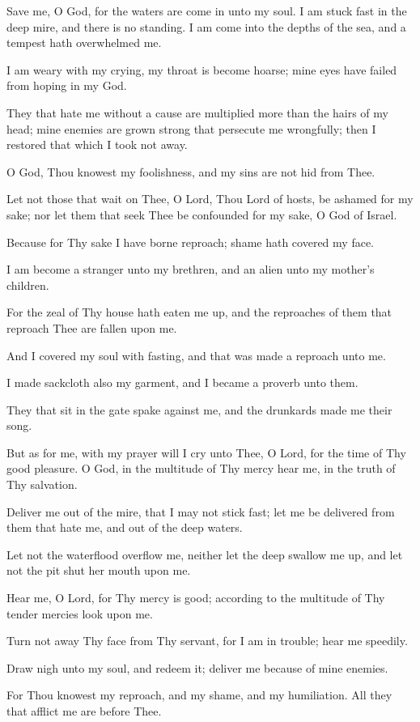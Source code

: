 Save me, O God, for the waters are come in unto my soul. I am stuck fast in the deep mire, and there is no standing. I am come into the depths of the sea, and a tempest hath overwhelmed me.

I am weary with my crying, my throat is become hoarse; mine eyes have failed from hoping in my God.

They that hate me without a cause are multiplied more than the hairs of my head; mine enemies are grown strong that persecute me wrongfully; then I restored that which I took not away.

O God, Thou knowest my foolishness, and my sins are not hid from Thee.

Let not those that wait on Thee, O Lord, Thou Lord of hosts, be ashamed for my sake; nor let them that seek Thee be confounded for my sake, O God of Israel.

Because for Thy sake I have borne reproach; shame hath covered my face.

I am become a stranger unto my brethren, and an alien unto my mother's children.

For the zeal of Thy house hath eaten me up, and the reproaches of them that reproach Thee are fallen upon me.

And I covered my soul with fasting, and that was made a reproach unto me.

I made sackcloth also my garment, and I became a proverb unto them.

They that sit in the gate spake against me, and the drunkards made me their song.

But as for me, with my prayer will I cry unto Thee, O Lord, for the time of Thy good pleasure. O God, in the multitude of Thy mercy hear me, in the truth of Thy salvation.

Deliver me out of the mire, that I may not stick fast; let me be delivered from them that hate me, and out of the deep waters.

Let not the waterflood overflow me, neither let the deep swallow me up, and let not the pit shut her mouth upon me.

Hear me, O Lord, for Thy mercy is good; according to the multitude of Thy tender mercies look upon me.

Turn not away Thy face from Thy servant, for I am in trouble; hear me speedily.

Draw nigh unto my soul, and redeem it; deliver me because of mine enemies.

For Thou knowest my reproach, and my shame, and my humiliation. All they that afflict me are before Thee.

